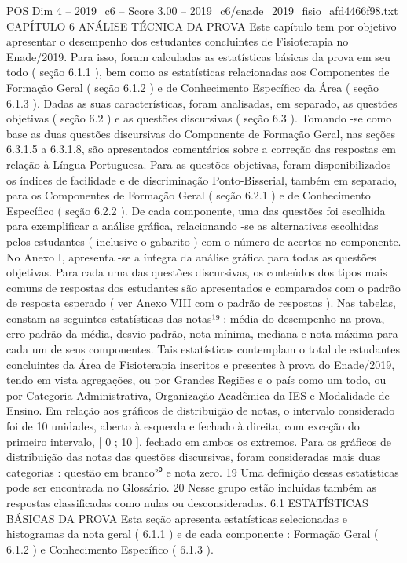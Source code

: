 \begin{textsample}{POS Dim 4 – 2019\_c6 – Score 3.00 – 2019\_c6/enade\_2019\_fisio\_afd4466f98.txt}  \label{ex:f4_pos_094}
CAPÍTULO 6 ANÁLISE TÉCNICA DA PROVA Este capítulo tem por objetivo apresentar o desempenho dos estudantes concluintes de Fisioterapia no Enade/2019.
Para isso, foram calculadas as estatísticas básicas da prova em seu todo ( seção 6.1.1 ), bem como as estatísticas relacionadas aos Componentes de Formação Geral ( seção 6.1.2 ) e de Conhecimento Específico da Área ( seção 6.1.3 ).
Dadas as suas características, foram analisadas, em separado, as questões objetivas ( seção 6.2 ) e as questões discursivas ( seção 6.3 ).
Tomando -se como base as duas questões discursivas do Componente de Formação Geral, nas seções 6.3.1.5 a 6.3.1.8, são apresentados comentários sobre a correção das respostas em relação à Língua Portuguesa.
Para as questões objetivas, foram disponibilizados os índices de facilidade e de discriminação Ponto-Bisserial, também em separado, para os Componentes de Formação Geral ( seção 6.2.1 ) e de Conhecimento Específico ( seção 6.2.2 ).
De cada componente, uma das questões foi escolhida para exemplificar a análise gráfica, relacionando -se as alternativas escolhidas pelos estudantes ( inclusive o gabarito ) com o número de acertos no componente.
No Anexo I, apresenta -se a íntegra da análise gráfica para todas as questões objetivas.
Para cada uma das questões discursivas, os conteúdos dos tipos mais comuns de respostas dos estudantes são apresentados e comparados com o padrão de resposta esperado ( ver Anexo VIII com o padrão de respostas ).
Nas tabelas, constam as seguintes estatísticas das notas¹⁹ : média do desempenho na prova, erro padrão da média, desvio padrão, nota mínima, mediana e nota máxima para cada um de seus componentes.
Tais estatísticas contemplam o total de estudantes concluintes da Área de Fisioterapia inscritos e presentes à prova do Enade/2019, tendo em vista agregações, ou por Grandes Regiões e o país como um todo, ou por Categoria Administrativa, Organização Acadêmica da IES e Modalidade de Ensino.
Em relação aos gráficos de distribuição de notas, o intervalo considerado foi de 10 unidades, aberto à esquerda e fechado à direita, com exceção do primeiro intervalo, [ 0 ; 10 ], fechado em ambos os extremos.
Para os gráficos de distribuição das notas das questões discursivas, foram consideradas mais duas categorias : questão em branco²⁰ e nota zero. 19 Uma definição dessas estatísticas pode ser encontrada no Glossário. 20 Nesse grupo estão incluídas também as respostas classificadas como nulas ou desconsideradas. 6.1 ESTATÍSTICAS BÁSICAS DA PROVA Esta seção apresenta estatísticas selecionadas e histogramas da nota geral ( 6.1.1 ) e de cada componente : Formação Geral ( 6.1.2 ) e Conhecimento Específico ( 6.1.3 ).

\end{textsample}

